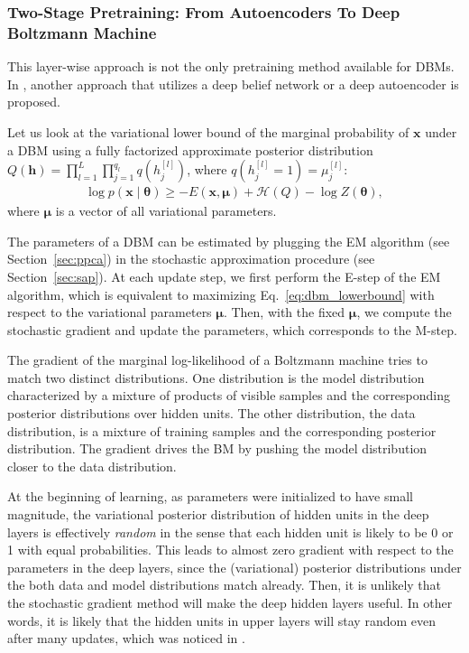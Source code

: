 \documentclass[dissertation,nocontribution,draft*]{aaltoseries}
\newcommand{\qlay}[1]{\left[#1\right]}
\newcommand{\vect}[1]{\mathbf{#1}}
\newcommand{\vects}[1]{\boldsymbol{#1}}
\newcommand{\vh}[0]{\vect{h}}
\newcommand{\vx}[0]{\vect{x}}
\newcommand{\vmu}[0]{\vects{\mu}}
\newcommand{\TT}[0]{{\vects{\theta}}}
\newcommand{\HH}[0]{\mathcal{H}}
\begin{document}
\subsubsection{Two-Stage Pretraining: From Autoencoders To
Deep Boltzmann Machine}

This layer-wise approach is not the only pretraining method
available for DBMs. In , another
approach that utilizes a deep belief network or a deep
autoencoder is proposed.

Let us look at the variational lower bound of the marginal
probability of $\vx$ under a DBM using a fully factorized
approximate posterior distribution \\
$Q(\vh) = \prod_{l=1}^L
\prod_{j=1}^{q_l} q(h_j^{\qlay{l}})$, where $q(h_j^{\qlay{l}}=1) =
\mu_j^{\qlay{l}}$:
\begin{align}
    \label{eq:dbm_lowerbound}
    \log p(\vx \mid \TT) \geq  -E (\vx, \vmu) + \HH(Q) - \log Z(\TT),
\end{align}
where $\vmu$ is a vector of all variational parameters.

The parameters of a DBM can be estimated by plugging the EM
algorithm (see Section~\ref{sec:ppca}) in the stochastic
approximation procedure (see Section~\ref{sec:sap}). At each
update step, we first perform the E-step of the EM
algorithm, which is equivalent to maximizing
Eq.~\eqref{eq:dbm_lowerbound} with respect to the
variational parameters $\vmu$. Then, with the fixed $\vmu$,
we compute the stochastic gradient and update the
parameters, which corresponds to the M-step.

The gradient of the marginal log-likelihood of a Boltzmann
machine tries to match two distinct distributions. One
distribution is the model distribution characterized by a
mixture of products of visible samples and the corresponding
posterior distributions over hidden units. The other
distribution, the data distribution, is a mixture of
training samples and the corresponding posterior
distribution. The gradient drives the BM by pushing the
model distribution closer to the data distribution.

At the beginning of learning, as parameters were initialized
to have small magnitude, the variational posterior
distribution of hidden units in the deep layers is
effectively \textit{random} in the sense that each hidden unit
is likely to be 0 or 1 with equal probabilities. This leads
to almost zero gradient with respect to the parameters in
the deep layers, since the (variational) posterior
distributions under the both data and model distributions
match already. Then, it is unlikely that the stochastic
gradient method will make the deep hidden layers useful. In
other words, it is likely that the hidden units in upper
layers will stay random even after many updates, which was
noticed in .
\end{document}
